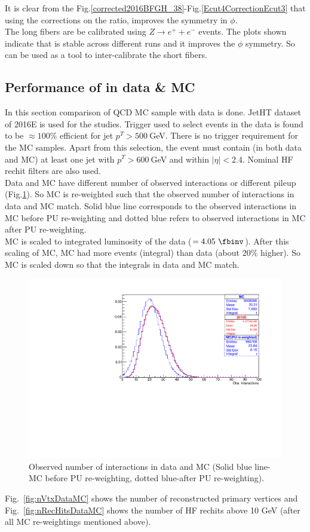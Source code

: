 It is clear from the Fig.\ref{corrected2016BFGH_38}-Fig.\ref{Ecut4CorrectionEcut3} that using the corrections on the ratio, improves the symmetry in $\phi$.\\
The long fibers are be calibrated using $Z\rightarrow e^+ + e^-$ events. The plots shown indicate that \ratiosl is stable across different runs and it improves the $\phi$ symmetry. So \ratiosl can be used as a tool to inter-calibrate the short fibers.


\subsection{Performance of \ratiosl in data \& MC}\label{sec:ana25ns}
In this section comparison of QCD MC sample with data is done. JetHT dataset of 2016E is used for the studies. Trigger used to select events in the data is found to be $\approx 100\%$ efficient for jet $p^T>500~$GeV. There is no trigger requirement for the MC samples. Apart from this selection, the event must contain (in both data and MC) at least one jet with $p^T>600~$GeV and within $|\eta|<2.4$. Nominal HF rechit filters are also used.\\
Data and MC have different number of observed interactions or different pileup (Fig.\ref{fig:DataMCobsIntPUWt}). So MC is re-weighted such that the observed number of interactions in data and MC match. 
Solid blue line corresponds to the observed interactions in MC before PU re-weighting and dotted blue refers to observed interactions in MC after PU re-weighting.\\
MC is scaled to integrated luminosity of the data ($=4.05\ \fbinv$). After this scaling of MC, MC had more events (integral) than data (about 20\% higher). So MC is scaled down so that the integrals in data and MC match. 

\begin{figure}[h!]
\centering
\includegraphics[width=0.7\linewidth]{../Figures/Chap2/ImageFiles_HF/BasicPics/DataMC/DataMCobsIntPUWt}
\captionsetup{width=.9\linewidth}
\caption[Observed no. of interactions in data and MC]{Observed number of interactions in data and MC (Solid blue line- MC before PU re-weighting, dotted blue-after PU re-weighting).}
\label{fig:DataMCobsIntPUWt}
\end{figure}
Fig.~\ref{fig:nVtxDataMC} shows the number of reconstructed primary vertices and Fig.~\ref{fig:nRecHitsDataMC} shows the number of HF rechits above 10 GeV (after all MC re-weightings mentioned above).

